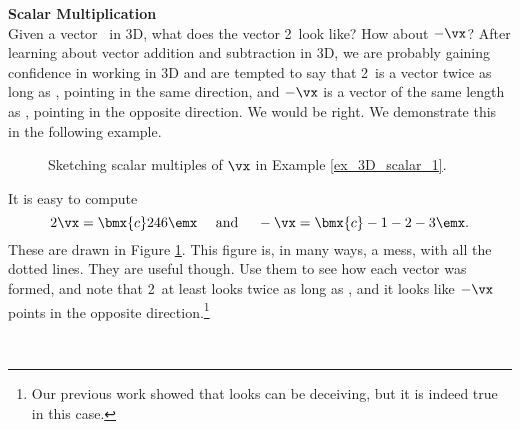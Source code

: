 \noindent \large \textsf{\textbf{Scalar Multiplication}} \normalsize\\

Given a vector \vx\ in 3D, what does the vector 2\vx\ look like? How about $-\vx$? After learning about vector addition and subtraction in 3D, we are probably gaining confidence in working in 3D and are tempted to say that 2\vx\ is a vector twice as long as \vx, pointing in the same direction, and $-\vx$ is a vector of the same length as \vx, pointing in the opposite direction. We would be right. We demonstrate this in the following example.\\

{\begin{figure}[h!]
\begin{center}
\end{center}
\caption{Sketching scalar multiples of $\protect \vx$ in Example \ref{ex_3D_scalar_1}.}
\label{fig:3D_scalar_1}
\end{figure}

It is easy to compute $$2\vx = \bmx{c}2\\4\\6\emx \quad \text{ and } \quad -\vx = \bmx{c} -1\\-2\\-3\emx.$$ These are drawn in Figure \ref{fig:3D_scalar_1}. This figure is, in many ways, a mess, with all the dotted lines. They are useful though. Use them to see how each vector was formed, and note that 2\vx\ at least looks twice as long as \vx, and it looks like $-\vx$ points in the opposite direction.\footnote{Our previous work showed that looks can be deceiving, but it is indeed true in this case.} }\\ %


